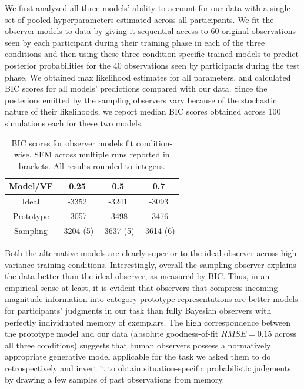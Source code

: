 \documentclass[10pt,letterpaper]{article}
\begin{document}
We first analyzed all three models' ability to account for our data with a single set of pooled hyperparameters estimated across all participants. We fit the observer models to data by giving it sequential access to 60 original observations seen by each participant during their training phase in each of the three conditions and then using these three condition-specific trained models to predict posterior probabilities for the 40 observations seen by participants during the test phase. We obtained max likelihood estimates for all parameters, and calculated BIC scores for all models' predictions compared with our data. Since the posteriors emitted by the sampling observers vary because of the stochastic nature of their likelihoods, we report median BIC scores obtained across 100 simulations each for these two models. 

\begin{table}[]
    \centering
    \begin{tabular}{|c|c|c|c|}
    \hline
         Model/VF & 0.25 & 0.5 & 0.7 \\
         \hline
         Ideal & -3352 & -3241 & -3093 \\
         Prototype & -3057 & -3498 & -3476 \\
         Sampling & -3204 (5) & -3637 (5) & -3614 (6) \\
         \hline 
    \end{tabular}
    \caption{BIC scores for observer models fit condition-wise. SEM across multiple runs reported in brackets. All results rounded to integers.}
    \label{tab:bic}
\end{table}

Both the alternative models are clearly superior to the ideal observer across high variance training conditions. Interestingly, overall the sampling observer explains the data better than the ideal observer, as measured by BIC. Thus, in an empirical sense at least, it is evident that observers that compress incoming magnitude information into category prototype representations are better models for participants' judgments in our task than fully Bayesian observers with perfectly individuated memory of exemplars. The high correspondence between the prototype model and our data (absolute goodness-of-fit $RMSE=0.15$ across all three conditions) suggests that human observers possess a normatively appropriate generative model applicable for the task we asked them to do retrospectively and invert it to obtain situation-specific probabilistic judgments by drawing a few samples of past observations from memory.  
\end{document}
